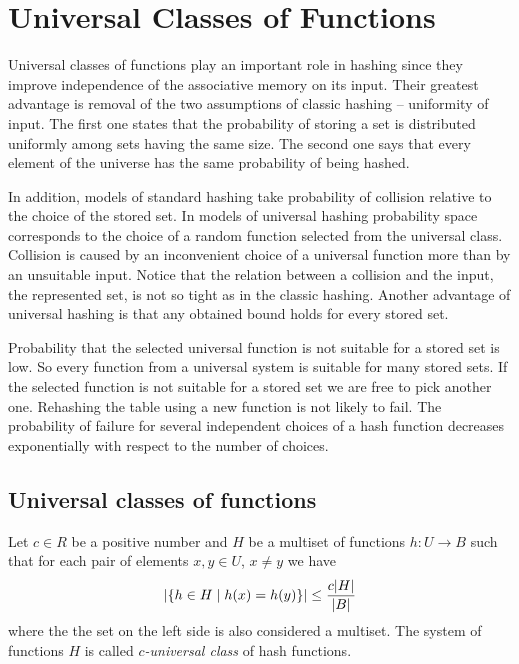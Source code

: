 \chapter{Universal Classes of Functions}
\label{chapter-universal-classes}

Universal classes of functions play an important role in hashing since they improve independence of the associative memory on its input. Their greatest advantage is removal of the two assumptions of classic hashing -- uniformity of input. The first one states that the probability of storing a set is distributed uniformly among sets having the same size. The second one says that every element of the universe has the same probability of being hashed. 

In addition, models of standard hashing take probability of collision relative to the choice of the stored set. In models of universal hashing probability space corresponds to the choice of a random function selected from the universal class. Collision is caused by an inconvenient choice of a universal function more than by an unsuitable input. Notice that the relation between a collision and the input, the represented set, is not so tight as in the classic hashing. Another advantage of universal hashing is that any obtained bound holds for every stored set.

Probability that the selected universal function is not suitable for a stored set is low. So every function from a universal system is suitable for many stored sets. If the selected function is not suitable for a stored set we are free to pick another one. Rehashing the table using a new function is not likely to fail. The probability of failure for several independent choices of a hash function decreases exponentially with respect to the number of choices.

\section{Universal classes of functions}

\begin{definition}
\label{c_universal_system}
Let $c \in R$ be a positive number and $H$ be a multiset of functions $h: U \rightarrow B$ such that for each pair of elements $x, y \in U$, $x \neq y$ we have 
\[ 
	\left| \lbrace h \in H \mid h(x) = h(y) \rbrace \right| \leq \frac {c |H|}{|B|}
\] 
where the the set on the left side is also considered a multiset. The system of functions $H$ is called \emph{$c$-universal class} of hash functions.
\end{definition}


